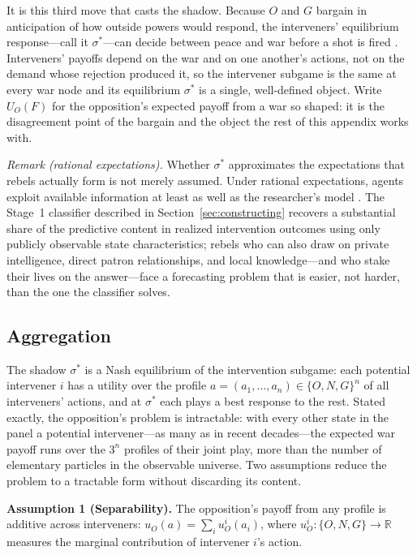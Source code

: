It is this third move that casts the shadow.  Because $O$ and $G$ bargain in
anticipation of how outside powers would respond, the interveners'
equilibrium response---call it $\sigma^*$---can decide between peace and war
before a shot is fired \citep{cetinyan2002}.  Interveners' payoffs depend on
the war and on one another's actions, not on the demand whose rejection
produced it, so the intervener subgame is the same at every war node and its
equilibrium $\sigma^*$ is a single, well-defined object.  Write $U_O(F)$ for
the opposition's expected payoff from a war so shaped: it is the disagreement
point of the bargain and the object the rest of this appendix works with.

\emph{Remark (rational expectations).}  Whether $\sigma^*$ approximates the
expectations that rebels actually form is not merely assumed.  Under rational
expectations, agents exploit available information at least as well as the
researcher's model \citep{muth1961}.  The Stage~1 classifier described in
Section~\ref{sec:constructing} recovers a substantial share of the predictive
content in realized intervention outcomes using only publicly observable
state characteristics; rebels who can also draw on private intelligence,
direct patron relationships, and local knowledge---and who stake their lives
on the answer---face a forecasting problem
that is easier, not harder, than the one the classifier solves.

\subsection{Aggregation}
\label{app:agg}

The shadow $\sigma^*$ is a Nash equilibrium of the intervention subgame: each
potential intervener $i$ has a utility over the profile $a = (a_1, \dots,
a_n) \in \{O, N, G\}^n$ of all interveners' actions, and at $\sigma^*$ each
plays a best response to the rest.  Stated exactly, the opposition's problem
is intractable: with every other state in the panel a potential
intervener---as many as \MaxInterveners{} in recent decades---the expected war payoff
runs over the $3^{n}$ profiles of their joint play, more than the number of
elementary particles in the observable universe.  Two assumptions reduce the
problem to a tractable form without discarding its content.

\textbf{Assumption 1 (Separability).}  The opposition's payoff from any
profile is additive across interveners: $u_O(a) = \sum_i u_O^i(a_i)$, where
$u_O^i : \{O, N, G\} \rightarrow \mathbb{R}$ measures the marginal
contribution of intervener $i$'s action.

